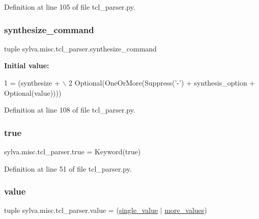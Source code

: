 Definition at line 105 of file tcl\+\_\+parser.\+py.

\mbox{\label{namespacesylva_1_1misc_1_1tcl__parser_a049055f00db6c830fd559bbf6724c726}} 
\subsubsection{\texorpdfstring{synthesize\+\_\+command}{synthesize\_command}}
{\footnotesize\ttfamily tuple sylva.\+misc.\+tcl\+\_\+parser.\+synthesize\+\_\+command}

{\bfseries Initial value\+:}
\begin{DoxyCode}
1 =  (synthesize + \(\backslash\)
2     Optional(OneOrMore(Suppress(\textcolor{stringliteral}{'-'}) + synthesis\_option + Optional(value))))
\end{DoxyCode}


Definition at line 108 of file tcl\+\_\+parser.\+py.

\mbox{\label{namespacesylva_1_1misc_1_1tcl__parser_a69ee465af30df5bf43aeceff5d2575f5}} 
\subsubsection{\texorpdfstring{true}{true}}
{\footnotesize\ttfamily sylva.\+misc.\+tcl\+\_\+parser.\+true = Keyword(\textquotesingle{}true\textquotesingle{})}



Definition at line 51 of file tcl\+\_\+parser.\+py.

\mbox{\label{namespacesylva_1_1misc_1_1tcl__parser_a83a1a4d978bc1a8a1bd92f71b754bad9}} 
\subsubsection{\texorpdfstring{value}{value}}
{\footnotesize\ttfamily tuple sylva.\+misc.\+tcl\+\_\+parser.\+value = (\hyperlink{namespacesylva_1_1misc_1_1tcl__parser_a92069bbdbd952a10c724671781cfcfd6}{single\+\_\+value} $\vert$ \hyperlink{namespacesylva_1_1misc_1_1tcl__parser_a400beccbf593cc4495fdd7ab101acb39}{more\+\_\+values})}



